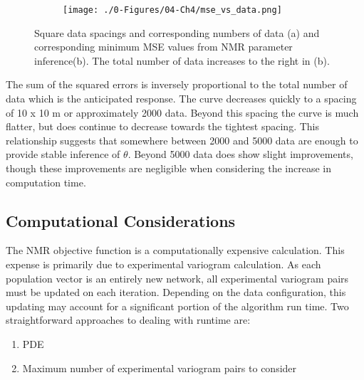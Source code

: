 \begin{figure}
    \begin{subtable}{.5\textwidth}
        \centering
        \resizebox{1\width}{!}{}
        \caption{}
        \label{tab:syn_data}
    \end{subtable}
    \begin{subfigure}{.5\textwidth}
        \centering
        \texttt{[image: ./0-Figures/04-Ch4/mse\_vs\_data.png]}
        \caption{}
        \label{fig:mse_vs_data_plot}
    \end{subfigure}
    \caption{Square data spacings and corresponding numbers of data (a) and corresponding minimum \gls{MSE} values from \gls{NMR} parameter inference(b). The total number of data increases to the right in (b). }
    \label{fig:mse_vs_data}
\end{figure}

The sum of the squared errors is inversely proportional to the total number of data which is the anticipated response. The curve decreases quickly to a spacing of 10 x 10 m or approximately 2000 data. Beyond this spacing the curve is much flatter, but does continue to decrease towards the tightest spacing. This relationship suggests that somewhere between 2000 and 5000 data are enough to provide stable inference of $\theta$. Beyond 5000 data does show slight improvements, though these improvements are negligible when considering the increase in computation time.

\FloatBarrier
\subsection{Computational Considerations}
\label{subsec:04comp}

The NMR objective function is a computationally expensive calculation. This expense is primarily due to experimental variogram calculation. As each population vector is an entirely new network, all experimental variogram pairs must be updated on each iteration. Depending on the data configuration, this updating may account for a significant portion of the algorithm run time. Two straightforward approaches to dealing with runtime are:
\begin{enumerate}
    \item \Gls{PDE}
    \item Maximum number of experimental variogram pairs to consider
\end{enumerate}

